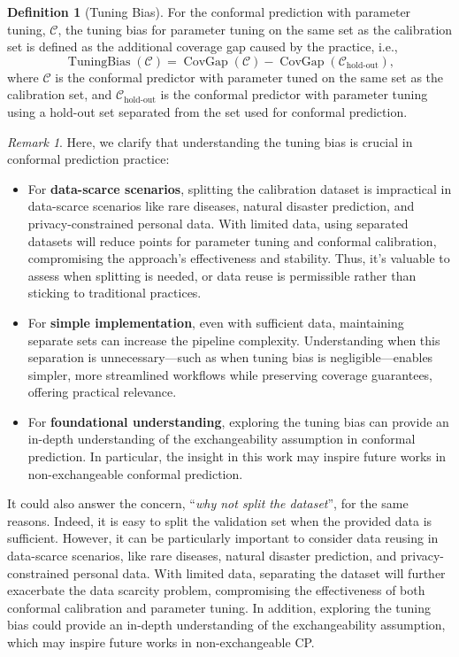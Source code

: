 \documentclass{article}
\newcommand{\1}{\mathbbm{1}}
\newcommand{\CovGap}{\mathop{\text{CovGap}}}
\newcommand{\TuningBias}{\mathop{\text{TuningBias}}}
\theoremstyle{plain}
\theoremstyle{definition}
\newtheorem{definition}[theorem]{Definition}
\theoremstyle{remark}
\newtheorem{remark}[theorem]{Remark}
\begin{document}
\begin{definition}[Tuning Bias]
\label{def:tuning_bias}
    For the conformal prediction with parameter tuning, \(\mathcal{C}\), the tuning bias for parameter tuning on the same set as the calibration set is defined as the additional coverage gap caused by the practice, i.e.,
    \begin{equation*}
        \TuningBias(\mathcal{C}) =  
        \CovGap(\mathcal{C}) - \CovGap(\mathcal{C}_{\text{hold-out}}),
    \end{equation*}
    where $\mathcal{C}$ is the conformal predictor with parameter tuned on the same set as the calibration set, and $\mathcal{C}_{\text{hold-out}}$ is the conformal predictor with parameter tuning using a hold-out set separated from the set used for conformal prediction.
\end{definition}
\begin{remark}
    Here, we clarify that understanding the tuning bias is crucial in conformal prediction practice:
    \begin{itemize}
        \item For \textbf{data-scarce scenarios}, splitting the calibration dataset is impractical in data-scarce scenarios like rare diseases, natural disaster prediction, and privacy-constrained personal data. With limited data, using separated datasets will reduce points for parameter tuning and conformal calibration, compromising the approach's effectiveness and stability. Thus, it’s valuable to assess when splitting is needed, or data reuse is permissible rather than sticking to traditional practices. 
        \item For \textbf{simple implementation}, even with sufficient data, maintaining separate sets can increase the pipeline complexity. Understanding when this separation is unnecessary—such as when tuning bias is negligible—enables simpler, more streamlined workflows while preserving coverage guarantees, offering practical relevance. 
        \item For \textbf{foundational understanding}, exploring the tuning bias can provide an in-depth understanding of the exchangeability assumption in conformal prediction. In particular, the insight in this work may inspire future works in non-exchangeable conformal prediction. 
    \end{itemize}
    It could also answer the concern, ``\textit{why not split the dataset}'', for the same reasons. Indeed, it is easy to split the validation set when the provided data is sufficient. 
    However, it can be particularly important to consider data reusing in data-scarce scenarios, like rare diseases, natural disaster prediction, and privacy-constrained personal data. With limited data, separating the dataset will further exacerbate the data scarcity problem, compromising the effectiveness of both conformal calibration and parameter tuning. In addition, exploring the tuning bias could provide an in-depth understanding of the exchangeability assumption, which may inspire future works in non-exchangeable CP\@.
\end{remark}
\end{document}
